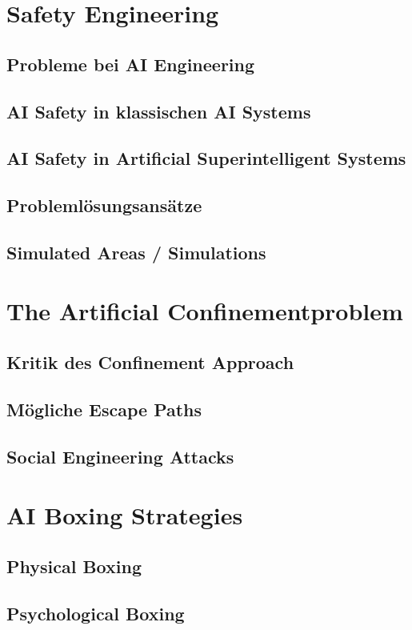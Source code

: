 \section{Safety Engineering}
    \subsection{Probleme bei AI Engineering}
    \subsection{AI Safety in klassischen AI Systems}
    \subsection{AI Safety in Artificial Superintelligent Systems}

    \subsection{Problemlösungsansätze} 
    \subsection{Simulated Areas / Simulations}
\section{The Artificial Confinementproblem}
    \subsection{Kritik des Confinement Approach}
    \subsection{Mögliche Escape Paths}
    \subsection{Social Engineering Attacks}
\section{AI Boxing Strategies}
    \subsection{Physical Boxing}
    \subsection{Psychological Boxing}
